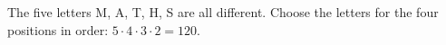 The five letters M, A, T, H, S are all different. Choose the letters for the four positions in order: $5\cdot4\cdot3\cdot2=\boxed{120}$.

